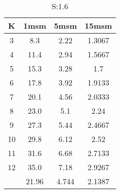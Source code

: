 \begin{table}[H]
\centering
\begin{tabular}{c|ccc}
K &1msm &5msm &15msm\\
\hline
3 & 8.3 & 2.22 & 1.3067\\
4 & 11.4 & 2.94 & 1.5667\\
5 & 15.3 & 3.28 & 1.7\\
6 & 17.8 & 3.92 & 1.9133\\
7 & 20.1 & 4.56 & 2.0333\\
8 & 23.0 & 5.1 & 2.24\\
9 & 27.3 & 5.44 & 2.4667\\
10 & 29.8 & 6.12 & 2.52\\
11 & 31.6 & 6.68 & 2.7133\\
12 & 35.0 & 7.18 & 2.9267\\
\hline
& 21.96 & 4.744 & 2.1387\\
\end{tabular}
\caption{S:1.6}
\label{tab:s1.6}
\end{table}
